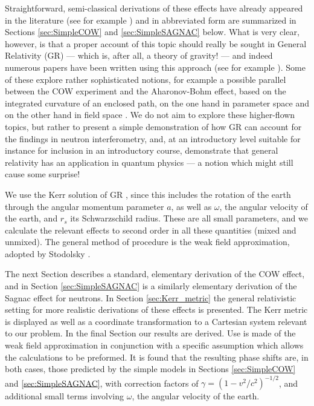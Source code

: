 \documentclass[twocolumn,reprint,amsmath,amssymb]{revtex4}
\begin{document}
Straightforward, semi-classical derivations of these effects have already appeared
in the literature (see for example \cite{3, 3.1, 4}) and in abbreviated form are summarized 
in Sections \ref{sec:SimpleCOW} and \ref{sec:SimpleSAGNAC} below. What is
very clear, however, is that a proper account of this topic should really be sought
in General Relativity (GR) --- which is, after all, a theory of gravity! --- and indeed
numerous papers have been written using this approach (see for example \cite{5,6,6.1,7,8}). 
Some of these explore rather sophisticated notions, for example a possible parallel between the COW experiment and the Aharonov-Bohm effect, based on the integrated curvature of an enclosed path, on the one hand in parameter space and on the other hand in field space \cite{7}. We do not aim to explore these higher-flown topics, but rather
to present a simple demonstration of how GR can account for the findings in neutron
interferometry, and, at an introductory level suitable for instance for inclusion
in an introductory course, demonstrate that general relativity has an application
in quantum physics \cite{SAKURAI93} --- a notion which might still cause some surprise! 


We use the Kerr solution of GR \cite{KERR63, BL67}, 
since this includes the rotation of the earth through
the angular momentum parameter $a$, as well as $\omega$, the angular velocity of the earth, and $r_s$ its
Schwarzschild radius. These are all small parameters, and we calculate
the relevant effects to second order in all these quantities (mixed and unmixed).
The general method of procedure is the weak field approximation, adopted by
Stodolsky \cite{5}.


The next Section describes a standard, elementary derivation of the COW
effect, and in Section \ref{sec:SimpleSAGNAC} is a similarly elementary 
derivation of the Sagnac effect
for neutrons. In Section \ref{sec:Kerr_metric} 
the general relativistic setting for more realistic
derivations of these effects is presented. The Kerr metric is displayed as well as a
coordinate transformation to a Cartesian system relevant to our problem. In the
final Section our results are derived. Use is made of the weak field approximation
in conjunction with a specific assumption which allows the calculations to be
preformed. It is found that the resulting phase shifts are, in both cases, those
predicted by the simple models in Sections \ref{sec:SimpleCOW} 
and \ref{sec:SimpleSAGNAC}, with correction factors of
$\gamma = (1- {v^2}/{c^2})^{-{1/2}}$, and additional small terms involving 
$\omega$, the angular velocity of the earth.
\end{document}
